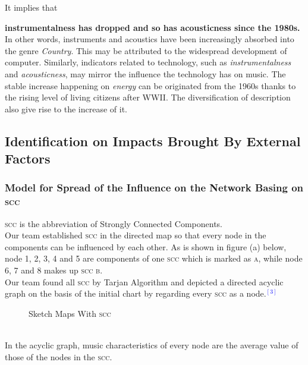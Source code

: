 \documentclass[12pt]{article}
\begin{document}
It implies that {\textbf{instrumentalness has dropped and so has acousticness since the 1980s.} In other words, instruments and acoustics have been increasingly absorbed into the genre {\textit{Country}}. This may be attributed to the widespread development of computer. Similarly, indicators related to technology, such as {\textit{instrumentalness}} and {\textit{acousticness}}, may mirror the influence the technology has on music. The stable increase happening on \textit{energy} can be originated from the 1960s thanks to the rising level of living citizens after WWII. The diversification of description also give rise to the increase of it.
\subsection{Identification on Impacts Brought By External Factors}
\subsubsection{Model for Spread of the Influence on the Network Basing on \textsc{scc}}
\textsc{scc} is the abbreviation of Strongly Connected Components.\\[2ex]
Our team established \textsc{scc} in the directed map so that every node in the components can be influenced by each other. As is shown in figure (a) below, node 1, 2, 3, 4 and 5 are components of one \textsc{scc} which is marked as \textsc{a}, while node 6, 7 and 8 makes up \textsc{scc b}. \\[2ex]
Our team found all \textsc{scc} by Tarjan Algorithm and depicted a directed acyclic graph on the basis of the initial chart by regarding every \textsc{scc} as a node.\textcolor{blue}{$^{[3]}$}
\begin{figure}[h]
\centering
	\begin{subfigure}[Sketch Map of \textsc{scc}]
		{\texttt{[image: Music19]}}
	\end{subfigure}
	\hspace{2cm}
	\begin{subfigure}[Sketch Map of Shrink Point]
		{\texttt{[image: Music20]}}
	\end{subfigure}
\caption{Sketch Maps With \textsc{scc}}
\end{figure}\\
In the acyclic graph, music characteristics of every node are the average value of those of the nodes in the \textsc{scc}.
}
\end{document}
